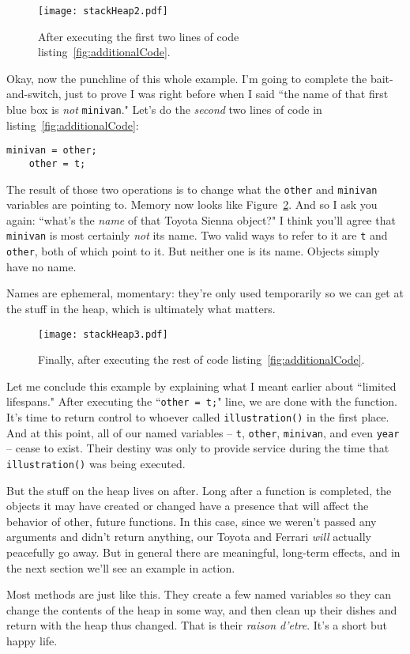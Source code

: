 \begin{figure}[ht]
\centering
\texttt{[image: stackHeap2.pdf]}   %
\caption{After executing the first two lines of code
listing~\ref{fig:additionalCode}.}
\label{fig:stackHeap2}
\end{figure}


Okay, now the punchline of this whole example. I'm going to complete the
bait-and-switch, just to prove I was right before when I said ``the name of
that first blue box is \textit{not} \texttt{minivan}." Let's do the
\textit{second} two lines of code in listing~\ref{fig:additionalCode}:

\begin{Verbatim}[fontsize=\small,samepage=true]
    minivan = other;
    other = t;
\end{Verbatim}

The result of those two operations is to change what the \texttt{other} and
\texttt{minivan} variables are pointing to. Memory now looks like
Figure~\ref{fig:stackHeap3}. And so I ask you again: ``what's the
\textit{name} of that Toyota Sienna object?" I think you'll agree that
\texttt{minivan} is most certainly \textit{not} its name. Two valid ways to
refer to it are \texttt{t} and \texttt{other}, both of which point to it. But
neither one is its name. Objects simply have no name.

Names are ephemeral, momentary: they're only used temporarily so we can get at
the stuff in the heap, which is ultimately what matters.

\begin{figure}[ht]
\centering
\texttt{[image: stackHeap3.pdf]}   %
\caption{Finally, after executing the rest of code
listing~\ref{fig:additionalCode}.}
\label{fig:stackHeap3}
\end{figure}

Let me conclude this example by explaining what I meant earlier about
``limited lifespans." After executing the ``\texttt{other = t;}" line, we are
done with the function. It's time to return control to whoever called
\texttt{illustration()} in the first place. And at this point, all of our
named variables -- \texttt{t}, \texttt{other}, \texttt{minivan}, and even
\texttt{year} -- cease to exist. Their destiny was only to provide service
during the time that \texttt{illustration()} was being executed. 

But the stuff on the heap lives on after. Long after a function is completed,
the objects it may have created or changed have a presence that will affect
the behavior of other, future functions. In this case, since we weren't passed
any arguments and didn't return anything, our Toyota and Ferrari \textit{will}
actually peacefully go away. But in general there are meaningful, long-term
effects, and in the next section we'll see an example in action.

Most methods are just like this. They create a few named variables so they can
change the contents of the heap in some way, and then clean up their dishes
and return with the heap thus changed. That is their \textit{raison d'etre}.
It's a short but happy life.



